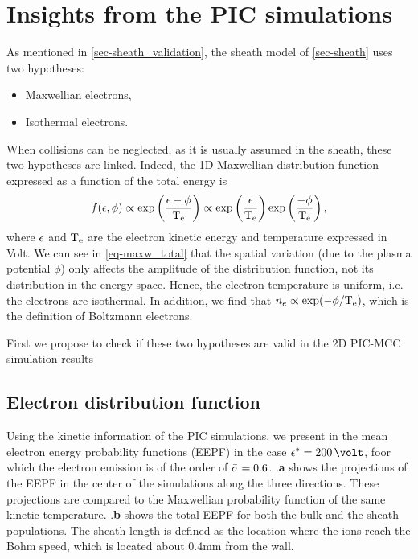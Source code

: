 


\section{Insights from the PIC simulations}
  \label{sec-insights}

  As mentioned in \cref{sec-sheath_validation}, the sheath model of \cref{sec-sheath} uses two hypotheses\string:
  \begin{itemize}
    \item Maxwellian electrons,
    \item Isothermal electrons.
  \end{itemize}

  When collisions can be neglected, as it is usually assumed in the sheath, these two hypotheses are linked.
  Indeed, the \ac{1D} Maxwellian distribution function expressed as a function of the total energy is
  \begin{equation} \label{eq-maxw_total}
    f(\epsilon, \phi) \propto \exp \left( \frac{\epsilon - \phi}{\mathrm{T_e}}  \right)  \propto \exp \left( \frac{\epsilon}{\mathrm{T_e}} \right) \exp \left( \frac{-\phi}{\mathrm{T_e}} \right),
  \end{equation}
  where $\epsilon$ and $\mathrm{T_e}$ are the electron kinetic energy and temperature expressed in Volt.
  We can see in \cref{eq-maxw_total} that the spatial variation (due to the plasma potential $\phi$) only affects the amplitude of the distribution function, not its distribution in the energy space.
  Hence, the electron temperature is uniform, i.e. the electrons are isothermal.
  In addition, we find that $n_e \propto \exp (- \phi / \mathrm{T_e})$, which is the definition of Boltzmann electrons.

  First we propose to check  if these two hypotheses are valid  in the \ac{2D} \ac{PIC}-\ac{MCC} simulation results

  \subsection{Electron distribution function}
    \label{subsec-eedf_2D}

    Using the kinetic information of the PIC simulations, we present in  the mean electron energy probability functions (EEPF) in the case $\crover = 200\,\volt$, foor which the electron emission is of the order of $ \bar{\sigma }=0.6$.
    .{\bf a} shows the projections of the EEPF in the center of the simulations along the three directions.
    These projections are compared to the Maxwellian probability function of the same
    kinetic temperature.
    .{\bf b} shows the total EEPF for both the bulk and the sheath populations.
    The sheath length is defined as the location where the ions reach the Bohm speed, which is located about 0.4mm from the wall.
     
